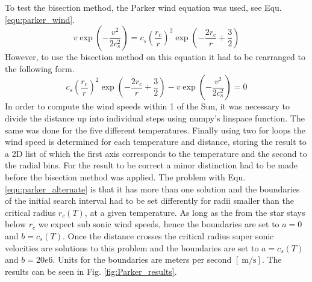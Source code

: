 \documentclass{aa}
\begin{document}
To test the bisection method, the Parker wind equation was used, see Equ.
\ref{equ:parker_wind}.
\begin{equation}
    \label{equ:parker_wind}
    v \exp \left(-\frac{v^2}{2c_s^2}\right) = c_s \left(\frac{r_c}{r}\right)^2
    \exp \left(- \frac{2r_c}{r} + \frac{3}{2}\right)
\end{equation}
However, to use the bisection method on this equation it had to be rearranged to
the following form.
\begin{equation}
    \label{equ:parker_alternate}
    c_s \left(\frac{r_c}{r}\right)^2 \exp \left(-\frac{2r_c}{r} + \frac{3}{2}\right)
    -v \exp \left(- \frac{v^2}{2c_s^2}\right) = 0
\end{equation}
In order to compute the wind speeds within \SI{1}{\AU} of the Sun, it was
necessary to divide the distance up into individual steps using numpy's linspace
function. The same was done for the five different temperatures. Finally using
two for loops the wind speed is determined for each temperature and distance,
storing the result to a 2D list of which the first axis corresponds to the
temperature and the second to the radial bins. For the result to be correct a
minor distinction had to be made before the bisection method was applied. The
problem with Equ. \ref{equ:parker_alternate} is that it has more than one
solution and the boundaries of the initial search interval had to be set
differently for radii smaller than the critical radius \(r_c(T)\), at a given
temperature. As long as the from the star stays below \(r_c\) we expect sub
sonic wind speeds, hence the boundaries are set to \(a=0\) and \(b=c_s(T)\).
Once the distance crosses the critical radius super sonic velocities are
solutions to this problem and the boundaries are set to \(a=c_s(T)\) and
\(b=20e6\). Units for the boundaries are meters per second
\([\SI{}{\meter\per\second}]\). The results can be seen in Fig. 
\ref{fig:Parker_results}.
\end{document}
